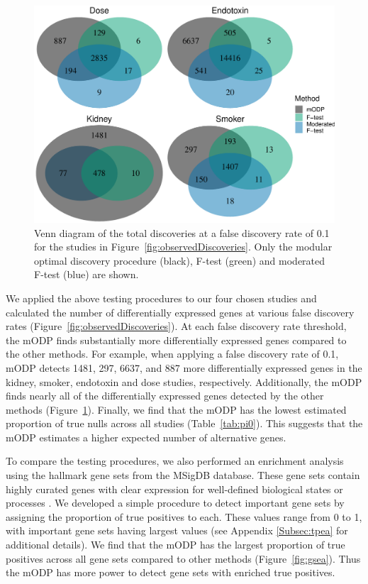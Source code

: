 \documentclass[11pt]{article}
\begin{document}
\begin{figure}
\centering
\includegraphics[scale = 0.5]{../analysis/figures/venn_diagram.pdf}  
\caption{Venn diagram of the total discoveries at a false discovery rate of 0.1 for the studies in Figure~\ref{fig:observedDiscoveries}. Only the modular optimal discovery procedure (black), F-test (green) and moderated F-test (blue) are shown.}
\label{fig:venn}
\end{figure}

We applied the above testing procedures to our four chosen studies and calculated the number of differentially expressed genes at various false discovery rates (Figure~\ref{fig:observedDiscoveries}). At each false discovery rate threshold, the mODP finds substantially more differentially expressed genes compared to the other methods. For example, when applying a false discovery rate of 0.1, mODP detects 1481, 297, 6637, and 887 more differentially expressed genes in the kidney, smoker, endotoxin and dose studies, respectively. Additionally, the mODP finds nearly all of the differentially expressed genes detected by the other methods (Figure~\ref{fig:venn}). Finally, we find that the mODP has the lowest estimated proportion of true nulls across all studies (Table~\ref{tab:pi0}). This suggests that the mODP estimates a higher expected number of alternative genes.

To compare the testing procedures, we also performed an enrichment analysis using the hallmark gene sets from the MSigDB database. These gene sets contain highly curated genes with clear expression for well-defined biological states or processes \citep{liberzon2015, liberzon2011}. We developed a simple procedure to detect important gene sets by assigning the proportion of true positives to each. These values range from 0 to 1, with important gene sets having largest values (see Appendix \ref{Subsec:tpea} for additional details). We find that the mODP has the largest proportion of true positives across all gene sets compared to other methods (Figure~\ref{fig:gsea}). Thus the mODP has more power to detect gene sets with enriched true positives.
\end{document}

